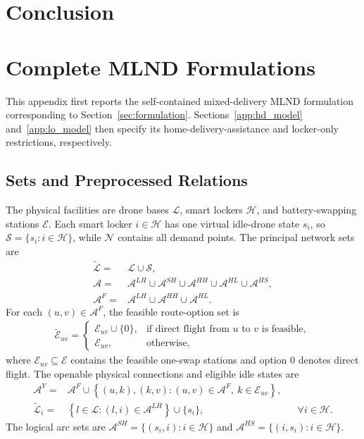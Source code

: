 \documentclass[final,3p,authoryear]{elsarticle}
\begin{document}
\section{Conclusion}
\label{sec:conclusion}





\appendix
\begingroup
\section{Complete MLND Formulations}
\label{app:full_model}

This appendix first reports the self-contained mixed-delivery MLND formulation corresponding to Section~\ref{sec:formulation}.
Sections~\ref{app:hd_model} and~\ref{app:lo_model} then specify its home-delivery-assistance and locker-only restrictions, respectively.

\subsection{Sets and Preprocessed Relations}

The physical facilities are drone bases $\mathcal L$, smart lockers $\mathcal H$, and battery-swapping stations $\mathcal E$.
Each smart locker $i\in\mathcal H$ has one virtual idle-drone state $s_i$, so $\mathcal S=\{s_i:i\in\mathcal H\}$, while $\mathcal N$ contains all demand points.
The principal network sets are
\begin{align}
\widetilde{\mathcal L}
={}&
\mathcal L\cup\mathcal S,
\label{app:set_idle}
\\
\mathcal A
={}&
\mathcal A^{LH}
\cup\mathcal A^{SH}
\cup\mathcal A^{HH}
\cup\mathcal A^{HL}
\cup\mathcal A^{HS},
\label{app:set_balance_arcs}
\\
\mathcal A^{F}
={}&
\mathcal A^{LH}
\cup\mathcal A^{HH}
\cup\mathcal A^{HL}.
\label{app:set_physical_arcs}
\end{align}
For each $(u,v)\in\mathcal A^{F}$, the feasible route-option set is
\begin{align}
\widetilde{\mathcal E}_{uv}
=
\begin{cases}
\mathcal E_{uv}\cup\{0\},
& \text{if direct flight from $u$ to $v$ is feasible},\\
\mathcal E_{uv},
& \text{otherwise},
\end{cases}
\label{app:set_route_options}
\end{align}
where $\mathcal E_{uv}\subseteq\mathcal E$ contains the feasible one-swap stations and option $0$ denotes direct flight.
The openable physical connections and eligible idle states are
\begin{align}
\mathcal A^{Y}
={}&
\mathcal A^{F}
\cup
\left\{
(u,k),(k,v):
(u,v)\in\mathcal A^{F},\
k\in\mathcal E_{uv}
\right\},
\label{app:set_openable_arcs}
\\
\widetilde{\mathcal L}_{i}
={}&
\left\{
l\in\mathcal L:(l,i)\in\mathcal A^{LH}
\right\}
\cup\{s_i\},
&&\forall i\in\mathcal H.
\label{app:set_eligible_idle}
\end{align}
The logical arc sets are $\mathcal A^{SH}=\{(s_i,i):i\in\mathcal H\}$ and $\mathcal A^{HS}=\{(i,s_i):i\in\mathcal H\}$.
\end{document}
